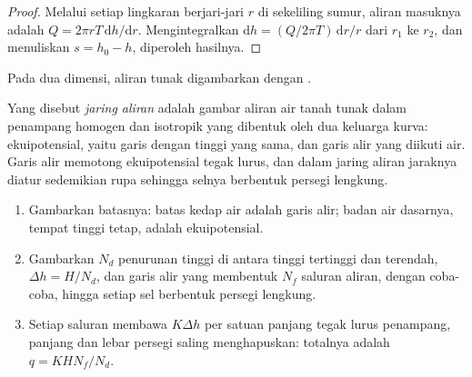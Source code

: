 \begin{proof}
Melalui setiap lingkaran berjari-jari $r$ di sekeliling sumur, aliran masuknya adalah $Q = 2\pi r
T\,\mathrm dh/\mathrm dr$. Mengintegralkan $\mathrm dh = (Q/2\pi T)\,\mathrm
dr/r$ dari $r_1$ ke $r_2$, dan menuliskan $s = h_0 - h$, diperoleh hasilnya.
\end{proof}

Pada dua dimensi, aliran tunak digambarkan dengan .

\begin{definition}\label{def:b3:hydrogeology:flow-net}
Yang disebut \emph{jaring aliran} adalah gambar aliran air tanah tunak dalam
penampang homogen dan isotropik yang dibentuk oleh dua keluarga kurva: ekuipotensial,
yaitu garis dengan tinggi yang sama, dan garis alir yang diikuti air. Garis
alir memotong ekuipotensial tegak lurus, dan dalam jaring aliran
jaraknya diatur sedemikian rupa sehingga selnya berbentuk persegi lengkung.
\end{definition}

\begin{method}\label{met:b3:hydrogeology:flow-net}
\leavevmode
\begin{enumerate}
\item Gambarkan batasnya: batas kedap air adalah garis alir; badan air
  dasarnya, tempat tinggi tetap, adalah ekuipotensial.
\item Gambarkan $N_d$ penurunan tinggi di antara tinggi tertinggi dan terendah, $\Delta h
  = H/N_d$, dan garis alir yang membentuk $N_f$ saluran aliran, dengan coba-coba,
  hingga setiap sel berbentuk persegi lengkung.
\item Setiap saluran membawa $K\Delta h$ per satuan panjang tegak lurus
  penampang, panjang dan lebar persegi saling menghapuskan: totalnya adalah $q =
  KHN_f/N_d$.
\end{enumerate}
\end{method}

